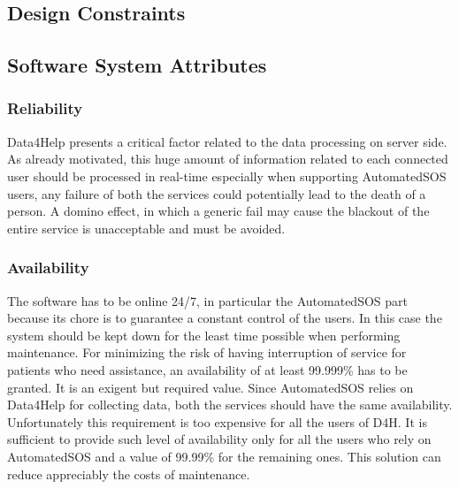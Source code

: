 \paragraph{}


{\color{Blue}\subsection{Design Constraints}}

{\color{Blue}\subsection{Software System Attributes}}
{\color{Blue}\subsubsection{Reliability}}
Data4Help presents a critical factor related to the data processing on server side. As already motivated, this huge amount of information related to each connected user should be processed in real-time especially when supporting AutomatedSOS users, any failure of both the services could potentially lead to the death of a person. A domino effect, in which a generic fail may cause the blackout of the entire service is unacceptable and must be avoided.
\paragraph{}

{\color{Blue}\subsubsection{Availability}}
The software has to be online 24/7, in particular the AutomatedSOS part because its chore is to guarantee a constant control of the users. In this case the system should be kept down for the least time possible when performing maintenance. For minimizing the risk of having interruption of service for patients who need assistance, an availability of at least 99.999\% has to be granted. It is an exigent but required value. Since AutomatedSOS relies on Data4Help for collecting data, both the services should have the same availability. Unfortunately this requirement is too expensive for all the users of D4H. It is sufficient to provide such level of availability only for all the users who rely on AutomatedSOS and a value of 99.99\% for the remaining ones. This solution can reduce appreciably the costs of maintenance.
